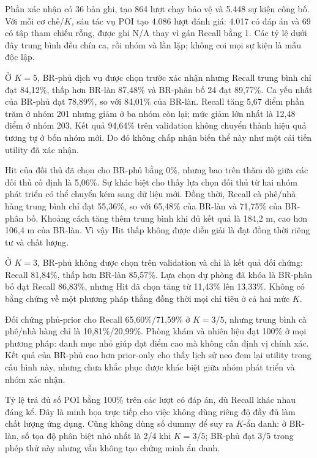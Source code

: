 Phần xác nhận có 36 bản ghi, tạo 864 lượt chạy bảo vệ và 5.448 sự kiện công bố. Với mỗi cơ chế/$K$, sáu tác vụ POI tạo 4.086 lượt đánh giá: 4.017 có đáp án và 69 có tập tham chiếu rỗng, được ghi N/A thay vì gán Recall bằng 1. Các tỷ lệ dưới đây trung bình đều chín ca, rồi nhóm và lần lặp; không coi mọi sự kiện là mẫu độc lập.

Ở $K=5$, BR-phủ dịch vụ được chọn trước xác nhận nhưng Recall trung bình chỉ đạt 84,12\%, thấp hơn BR-làn 87,48\% và BR-phân bố 24 đạt 89,77\%. Ca yếu nhất của BR-phủ đạt 78,89\%, so với 84,01\% của BR-làn. Recall tăng 5,67 điểm phần trăm ở nhóm 201 nhưng giảm ở ba nhóm còn lại; mức giảm lớn nhất là 12,48 điểm ở nhóm 203. Kết quả 94,64\% trên validation không chuyển thành hiệu quả tương tự ở bốn nhóm mới. Do đó không chấp nhận biến thể này như một cải tiến utility đã xác nhận.

Hit của đối thủ đã chọn cho BR-phủ bằng 0\%, nhưng bao trên thăm dò giữa các đối thủ cố định là 5,06\%. Sự khác biệt cho thấy lựa chọn đối thủ từ hai nhóm phát triển có thể chuyển kém sang dữ liệu mới. Đồng thời, Recall cà phê/nhà hàng trung bình chỉ đạt 55,36\%, so với 65,48\% của BR-làn và 71,75\% của BR-phân bố. Khoảng cách tăng thêm trung bình khi đủ kết quả là 184,2 m, cao hơn 106,4 m của BR-làn. Vì vậy Hit thấp không được diễn giải là đạt đồng thời riêng tư và chất lượng.

Ở $K=3$, BR-phủ không được chọn trên validation và chỉ là kết quả đối chứng: Recall 81,84\%, thấp hơn BR-làn 85,57\%. Lựa chọn dự phòng đã khóa là BR-phân bố đạt Recall 86,83\%, nhưng Hit đã chọn tăng từ 11,43\% lên 13,33\%. Không có bằng chứng về một phương pháp thắng đồng thời mọi chỉ tiêu ở cả hai mức $K$.



Đối chứng phủ-prior cho Recall 65,60\%/71,59\% ở $K=3/5$, nhưng trung bình cà phê/nhà hàng chỉ là 10,81\%/20,99\%. Phòng khám và nhiên liệu đạt 100\% ở mọi phương pháp: danh mục nhỏ giúp đạt điểm cao mà không cần định vị chính xác. Kết quả của BR-phủ cao hơn prior-only cho thấy lịch sử neo đem lại utility trong cấu hình này, nhưng chưa khắc phục được khác biệt giữa nhóm phát triển và nhóm xác nhận.

Tỷ lệ trả đủ số POI bằng 100\% trên các lượt có đáp án, dù Recall khác nhau đáng kể. Đây là minh họa trực tiếp cho việc không dùng riêng độ đầy đủ làm chất lượng ứng dụng. Cũng không dùng số dummy để suy ra $K$-ẩn danh: ở BR-làn, số tọa độ phân biệt nhỏ nhất là 2/4 khi $K=3/5$; BR-phủ đạt 3/5 trong phép thử này nhưng vẫn không tạo chứng minh ẩn danh.

